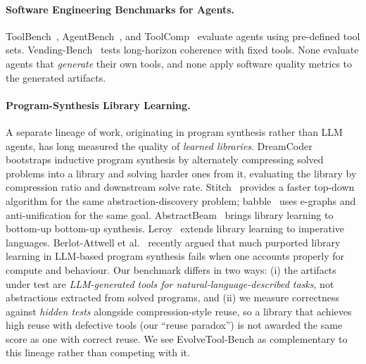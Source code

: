 \documentclass[sigplan,nonacm,natbib=false]{acmart}
\begin{document}
\paragraph{Software Engineering Benchmarks for Agents.} ToolBench~\cite{qin2023toolbench}, AgentBench~\cite{liu2024agentbench}, and ToolComp~\cite{toolcomp2025} evaluate agents using pre-defined tool sets. Vending-Bench~\cite{backlund2025vendingbench} tests long-horizon coherence with fixed tools. None evaluate agents that \emph{generate} their own tools, and none apply software quality metrics to the generated artifacts.

\paragraph{Program-Synthesis Library Learning.} A separate lineage of work, originating in program synthesis rather than LLM agents, has long measured the quality of \emph{learned libraries}. DreamCoder~\cite{ellis2021dreamcoder} bootstraps inductive program synthesis by alternately compressing solved problems into a library and solving harder ones from it, evaluating the library by compression ratio and downstream solve rate. Stitch~\cite{bowers2023stitch} provides a faster top-down algorithm for the same abstraction-discovery problem; babble~\cite{cao2023babble} uses e-graphs and anti-unification for the same goal. AbstractBeam~\cite{zenkner2024abstractbeam} brings library learning to bottom-up bottom-up synthesis. Leroy~\cite{bellur2024leroy} extends library learning to imperative languages. Berlot-Attwell et al.~\cite{berlotattwell2026} recently argued that much purported library learning in LLM-based program synthesis fails when one accounts properly for compute and behaviour. Our benchmark differs in two ways: (i) the artifacts under test are \emph{LLM-generated tools for natural-language-described tasks}, not abstractions extracted from solved programs, and (ii) we measure correctness against \emph{hidden tests} alongside compression-style reuse, so a library that achieves high reuse with defective tools (our ``reuse paradox'') is not awarded the same score as one with correct reuse. We see EvolveTool-Bench as complementary to this lineage rather than competing with it.
\end{document}
